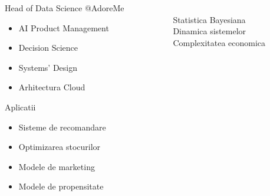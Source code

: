 \documentclass{beamer}
\begin{document}
\begin{frame}[t]{}
\centering {}
	 
\vspace{5mm}

\begin{columns}
	\begin{column}{0.5\textwidth}
	\begin{block}{Head of Data Science @AdoreMe}
	\begin{itemize}
		\item AI Product Management
		\item Decision Science
		\item Systems' Design
		\item Arhitectura Cloud
	\end{itemize}
	\end{block}
	
	\begin{block}{Aplicatii}
	\begin{itemize}
		\item Sisteme de recomandare
		\item Optimizarea stocurilor
		\item Modele de marketing
		\item Modele de propensitate
	\end{itemize}	
	\end{block}

	\end{column}

	\begin{column}{0.5\textwidth}	
		\begin{figure}[h]
		\\ Statistica Bayesiana
		\\ Dinamica sistemelor
		\\ Complexitatea economica
	\end{figure}
	\end{column}
\end{columns}
\end{frame}
\end{document}
